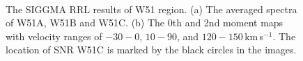 \documentclass[manuscript]{aastex61}
\newcommand{\kms}{\,km\,s$^{-1}$}
\begin{document}
\begin{figure}[htbp]
\centering
{}
\\
\caption{The SIGGMA RRL results of W51 region. (a) The averaged spectra of W51A, W51B and W51C. (b) The 0th and 2nd moment maps with velocity ranges of $-30-0$, $10-90$, and $120-150$\kms. The location of SNR W51C is marked by the black circles in the images.}\label{w51_rrl}
\end{figure}
\end{document}
